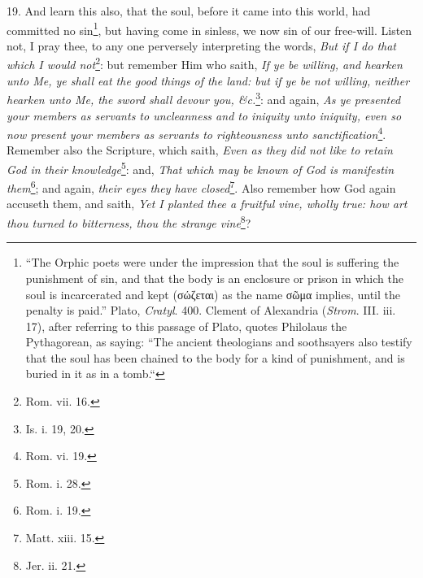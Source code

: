 19. And learn this also, that the soul, before it came into this world, had committed no sin\footnote{“The Orphic poets were under the impression that the soul is suffering the punishment of sin, and that the body is an enclosure or prison in which the soul is incarcerated and kept (\textgreek{σώζεται}) as the name \textgreek{σῶμα} implies, until the penalty is paid.” Plato, \emph{Cratyl}. 400. Clement of Alexandria (\emph{Strom}. III. iii. 17), after referring to this passage of Plato, quotes Philolaus the Pythagorean, as saying: “The ancient theologians and soothsayers also testify that the soul has been chained to the body for a kind of punishment, and is buried in it as in a tomb.“}, but having come in sinless, we now sin of our free-will. Listen not, I pray thee, to any one perversely interpreting the words, \emph{But if I do that which I would not}\footnote{Rom. vii. 16.}: but remember Him who saith, \emph{If ye be willing, and hearken unto Me, ye shall eat the good things of the land: but if ye be not willing, neither hearken unto Me, the sword shall devour you, \&c.}\footnote{Is. i. 19, 20.}: and again, \emph{As ye presented your members as servants to uncleanness and to iniquity unto iniquity, even so now present your members as servants to righteousness unto sanctification}\footnote{Rom. vi. 19.}. Remember also the Scripture, which saith, \emph{Even as they did not like to retain God in their knowledge}\footnote{Rom. i. 28.}: and, \emph{That which may be known of God is mani}\emph{festin them}\footnote{Rom. i. 19.}; and again, \emph{their eyes they have closed}\footnote{Matt. xiii. 15.}. Also remember how God again accuseth them, and saith, \emph{Yet I planted thee a fruitful vine, wholly true: how art thou turned to bitterness, thou the strange vine}\footnote{Jer. ii. 21.}?

